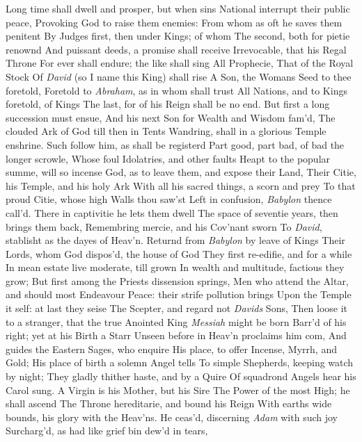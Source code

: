 \documentclass[11pt]{book}
\newcounter {first}
\newcounter {last}
\begin{document}
Long time shall dwell and prosper, but when sins 
National interrupt their public peace, 
Provoking God to raise them enemies: 
From whom as oft he saves them penitent 
By Judges first, then under Kings; of whom 
The second, both for pietie renownd 
And puissant deeds, a promise shall receive 
Irrevocable, that his Regal Throne 
For ever shall endure; the like shall sing 
All Prophecie, That of the Royal Stock 
Of \textit{David} (so I name this King) shall rise 
A Son, the Womans Seed to thee foretold, 
Foretold to \textit{Abraham}, as in whom shall trust 
All Nations, and to Kings foretold, of Kings 
The last, for of his Reign shall be no end. 
But first a long succession must ensue, 
And his next Son for Wealth and Wisdom fam'd, 
The clouded Ark of God till then in Tents 
Wandring, shall in a glorious Temple enshrine. 
Such follow him, as shall be registerd 
Part good, part bad, of bad the longer scrowle, 
Whose foul Idolatries, and other faults 
Heapt to the popular summe, will so incense 
God, as to leave them, and expose their Land, 
Their Citie, his Temple, and his holy Ark 
With all his sacred things, a scorn and prey 
To that proud Citie, whose high Walls thou saw'st 
Left in confusion, \textit{Babylon} thence call'd. 
There in captivitie he lets them dwell 
The space of seventie years, then brings them back, 
Remembring mercie, and his Cov'nant sworn 
To \textit{David}, stablisht as the dayes of Heav'n. 
Returnd from \textit{Babylon} by leave of Kings 
Their Lords, whom God dispos'd, the house of God 
They first re-edifie, and for a while 
In mean estate live moderate, till grown 
In wealth and multitude, factious they grow; 
But first among the Priests dissension springs, 
Men who attend the Altar, and should most 
Endeavour Peace: their strife pollution brings 
Upon the Temple it self: at last they seise 
The Scepter, and regard not \textit{Davids} Sons, 
Then loose it to a stranger, that the true 
Anointed King \textit{Messiah} might be born 
Barr'd of his right; yet at his Birth a Starr 
Unseen before in Heav'n proclaims him com, 
And guides the Eastern Sages, who enquire 
His place, to offer Incense, Myrrh, and Gold; 
His place of birth a solemn Angel tells 
To simple Shepherds, keeping watch by night; 
They gladly thither haste, and by a Quire 
Of squadrond Angels hear his Carol sung. 
A Virgin is his Mother, but his Sire 
The Power of the most High; he shall ascend 
The Throne hereditarie, and bound his Reign 
With earths wide bounds, his glory with the Heav'ns. 
\quad He ceas'd, discerning \textit{Adam} with such joy 
Surcharg'd, as had like grief bin dew'd in tears, 
\end{document}
